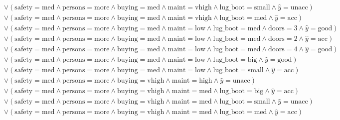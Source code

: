 \begin{scriptsize}
\[\begin{aligned}
  \\ & \lor (\text{safety}=\text{med} \land \text{persons}=\text{more} \land \text{buying}=\text{med} \land \text{maint}=\text{vhigh} \land \text{lug_boot}=\text{small} \land \hat{y}=\text{unacc})
  \\ & \lor (\text{safety}=\text{med} \land \text{persons}=\text{more} \land \text{buying}=\text{med} \land \text{maint}=\text{vhigh} \land \text{lug_boot}=\text{med} \land \hat{y}=\text{acc})
  \\ & \lor (\text{safety}=\text{med} \land \text{persons}=\text{more} \land \text{buying}=\text{med} \land \text{maint}=\text{low} \land \text{lug_boot}=\text{med} \land \text{doors}=\text{3} \land \hat{y}=\text{good})
  \\ & \lor (\text{safety}=\text{med} \land \text{persons}=\text{more} \land \text{buying}=\text{med} \land \text{maint}=\text{low} \land \text{lug_boot}=\text{med} \land \text{doors}=\text{2} \land \hat{y}=\text{acc})
  \\ & \lor (\text{safety}=\text{med} \land \text{persons}=\text{more} \land \text{buying}=\text{med} \land \text{maint}=\text{low} \land \text{lug_boot}=\text{med} \land \text{doors}=\text{4} \land \hat{y}=\text{good})
  \\ & \lor (\text{safety}=\text{med} \land \text{persons}=\text{more} \land \text{buying}=\text{med} \land \text{maint}=\text{low} \land \text{lug_boot}=\text{big} \land \hat{y}=\text{good})
  \\ & \lor (\text{safety}=\text{med} \land \text{persons}=\text{more} \land \text{buying}=\text{med} \land \text{maint}=\text{low} \land \text{lug_boot}=\text{small} \land \hat{y}=\text{acc})
  \\ & \lor (\text{safety}=\text{med} \land \text{persons}=\text{more} \land \text{buying}=\text{vhigh} \land \text{maint}=\text{high} \land \hat{y}=\text{unacc})
  \\ & \lor (\text{safety}=\text{med} \land \text{persons}=\text{more} \land \text{buying}=\text{vhigh} \land \text{maint}=\text{med} \land \text{lug_boot}=\text{big} \land \hat{y}=\text{acc})
  \\ & \lor (\text{safety}=\text{med} \land \text{persons}=\text{more} \land \text{buying}=\text{vhigh} \land \text{maint}=\text{med} \land \text{lug_boot}=\text{small} \land \hat{y}=\text{unacc})
  \\ & \lor (\text{safety}=\text{med} \land \text{persons}=\text{more} \land \text{buying}=\text{vhigh} \land \text{maint}=\text{med} \land \text{lug_boot}=\text{med} \land \hat{y}=\text{acc})

\end{aligned}\]
\end{scriptsize}
